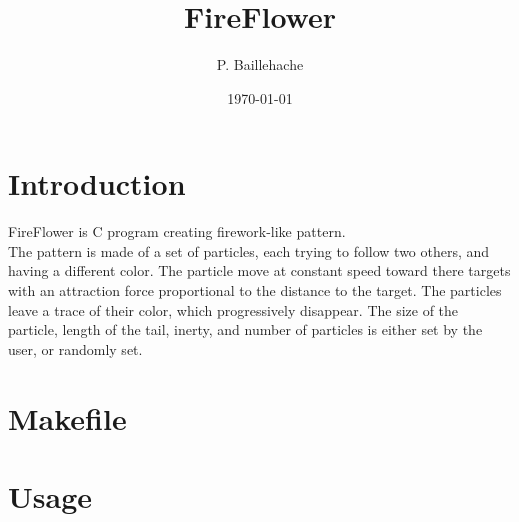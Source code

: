 \documentclass[12pt, a4paper]{article}
\begin{document}
\title{FireFlower}
\author{P. Baillehache}
\date{\today}
\maketitle

\tableofcontents

\section*{Introduction}

FireFlower is C program creating firework-like pattern.\\ 

The pattern is made of a set of particles, each trying to follow two others, and having a different color. The particle move at constant speed toward there targets with an attraction force proportional to the distance to the target. The particles leave a trace of their color, which progressively disappear. The size of the particle, length of the tail, inerty, and number of particles is either set by the user, or randomly set.\\

\section{Makefile}

\begin{scriptsize}
\begin{ttfamily}

\end{ttfamily}
\end{scriptsize}

\section{Usage}

\begin{scriptsize}
\begin{ttfamily}

\end{ttfamily}
\end{scriptsize}
\end{document}
